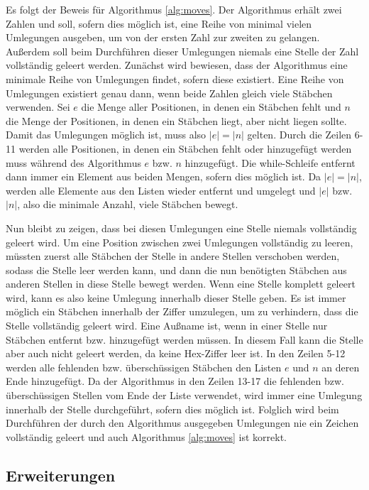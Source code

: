 \documentclass[a4paper,10pt,ngerman]{scrartcl}
\begin{document}
Es folgt der Beweis für Algorithmus \ref{alg:moves}.
Der Algorithmus erhält zwei Zahlen und soll, sofern dies möglich ist, eine Reihe von minimal vielen Umlegungen ausgeben, um von der ersten Zahl zur zweiten zu gelangen. Außerdem soll beim Durchführen dieser Umlegungen niemals eine Stelle der Zahl vollständig geleert werden. 
Zunächst wird bewiesen, dass der Algorithmus eine minimale Reihe von Umlegungen findet, sofern diese existiert. Eine Reihe von Umlegungen existiert genau dann, wenn beide Zahlen gleich viele Stäbchen verwenden. 
Sei $e$ die Menge aller Positionen, in denen ein Stäbchen fehlt und $n$ die Menge der Positionen, in denen ein Stäbchen liegt, aber nicht liegen sollte. 
Damit das Umlegungen möglich ist, muss also $|e| = |n|$ gelten. 
Durch die Zeilen 6-11 werden alle Positionen, in denen ein Stäbchen fehlt oder hinzugefügt werden muss während des Algorithmus $e$ bzw. $n$ hinzugefügt.
Die while-Schleife entfernt dann immer ein Element aus beiden Mengen, sofern dies möglich ist. 
Da $|e| = |n|$, werden  alle Elemente aus den Listen wieder entfernt und umgelegt und $|e|$ bzw. $|n|$, also die minimale Anzahl, viele Stäbchen bewegt. 

Nun bleibt zu zeigen, dass bei diesen Umlegungen eine Stelle niemals vollständig geleert wird.
Um eine Position zwischen zwei Umlegungen vollständig zu leeren, müssten zuerst alle Stäbchen der Stelle in andere Stellen verschoben werden, sodass die Stelle leer werden kann, und dann die nun benötigten Stäbchen aus anderen Stellen in diese Stelle bewegt werden. 
Wenn eine Stelle komplett geleert wird, kann es also keine Umlegung innerhalb dieser Stelle geben. 
Es ist immer möglich ein Stäbchen innerhalb der Ziffer umzulegen, um zu verhindern, dass die Stelle vollständig geleert wird. Eine Außname ist, wenn in einer Stelle nur Stäbchen entfernt bzw. hinzugefügt werden müssen. In diesem Fall kann die Stelle aber auch nicht geleert werden, da keine Hex-Ziffer leer ist. 
In den Zeilen 5-12 werden alle fehlenden bzw. überschüssigen Stäbchen den Listen $e$ und $n$ an deren Ende hinzugefügt. 
Da der Algorithmus in den Zeilen 13-17 die fehlenden bzw. überschüssigen Stellen vom Ende der Liste verwendet, wird immer eine Umlegung innerhalb der Stelle durchgeführt, sofern dies möglich ist.
Folglich wird beim Durchführen der durch den Algorithmus ausgegeben Umlegungen nie ein Zeichen vollständig geleert und auch Algorithmus \ref{alg:moves} ist korrekt.

\subsection{Erweiterungen}
\end{document}
